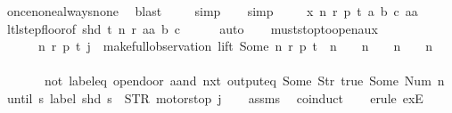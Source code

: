 \begin{isabellebody}
\ once{\isacharunderscore}none{\isacharunderscore}always{\isacharunderscore}none\ \isamarkupfalse%
\ blast\isanewline
\ \ \ \isamarkupfalse%
\ simp\isanewline
\ \ \isamarkupfalse%
\ simp\isanewline
\ \ \isamarkupfalse%
\ \ x\ n\ r\ p\ t\ a\ b\ c\ aa\isanewline
\ \ \ \ \isamarkupfalse%
\ ltl{\isacharunderscore}step{\isacharunderscore}floor{\isacharbrackleft}of\ {\isachardoublequoteopen}shd\ t{\isachardoublequoteclose}\ n\ r\ aa\ b\ c{\isacharbrackright}\isanewline
\ \ \ \ \isamarkupfalse%
\ auto\isanewline
\ \ \isamarkupfalse%
%
\endisatagproof
{\isafoldproof}%
%
\isadelimproof
\isanewline
%
\endisadelimproof
\isanewline
{}\isamarkupfalse%
\ must{\isacharunderscore}stop{\isacharunderscore}to{\isacharunderscore}open{\isacharunderscore}aux{}{\isacharcolon}\isanewline
\ \ \ \ \ {\isachardoublequoteopen}{\isasymexists}\ n\ r\ p\ t{\isachardot}\ j\ {\isacharequal}\ {\isacharparenleft}make{\isacharunderscore}full{\isacharunderscore}observation\ lift\ {\isacharparenleft}Some\ n{\isacharparenright}\ r\ p\ t{\isacharparenright}\ {\isasymand}\ {\isacharparenleft}n\ {\isacharequal}\ {}\ {\isasymor}\ n\ {\isacharequal}\ {}\ {\isasymor}\ n\ {\isacharequal}\ {}\ {\isasymor}\ n\ {\isacharequal}\ {}{\isacharparenright}{\isachardoublequoteclose}\isanewline
\ \ \ \ \ {\isachardoublequoteopen}\isanewline
\ \ \ \ \ \ \ {\isacharparenleft}{\isacharparenleft}not\ {\isacharparenleft}label{\isacharunderscore}eq\ {\isacharprime}{\isacharprime}opendoor{\isacharprime}{\isacharprime}\ aand\ nxt\ {\isacharparenleft}output{\isacharunderscore}eq\ {\isacharbrackleft}Some\ {\isacharparenleft}Str\ {\isacharprime}{\isacharprime}true{\isacharprime}{\isacharprime}{\isacharparenright}{\isacharcomma}\ Some\ {\isacharparenleft}Num\ n{\isacharparenright}{\isacharbrackright}{\isacharparenright}{\isacharparenright}{\isacharparenright}\ until\ {\isacharparenleft}{\isasymlambda}s{\isachardot}\ label\ {\isacharparenleft}shd\ s{\isacharparenright}\ {\isacharequal}\ STR\ {\isacharprime}{\isacharprime}motorstop{\isacharprime}{\isacharprime}{\isacharparenright}{\isacharparenright}\ j{\isachardoublequoteclose}\isanewline
%
\isadelimproof
\ \ %
\endisadelimproof
%
\isatagproof
{}\isamarkupfalse%
\ assms\ \isamarkupfalse%
\ coinduct\isanewline
\ \ \isamarkupfalse%
\ {\isacharparenleft}erule\ exE{\isacharparenright}{\isacharplus}\isanewline

\end{isabellebody}
